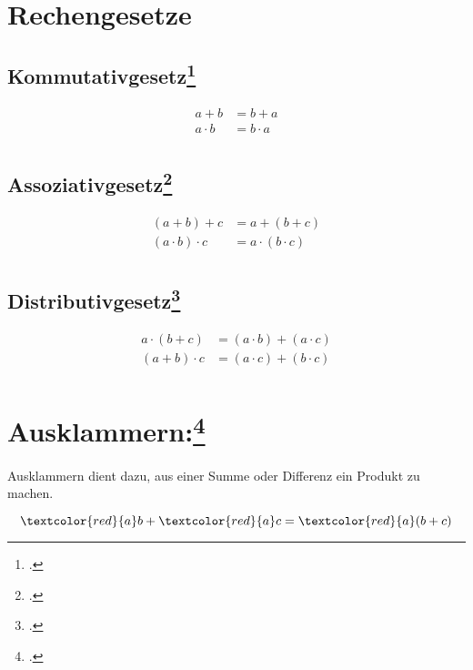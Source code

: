 \documentclass{lehramt-informatik-haupt}
\begin{document}
\section{Rechengesetze}

%

\subsection{Kommutativgesetz\footcite{wiki:kommutativgesetz}}

\begin{align*}
a + b &= b + a \\
a \cdot b &= b \cdot a \\
\end{align*}

%

\subsection{Assoziativgesetz\footcite{wiki:assoziativgesetz}}

\begin{align*}
(a + b) + c &= a + (b + c) \\
(a \cdot b) \cdot c &= a \cdot (b \cdot c) \\
\end{align*}

%

\subsection{Distributivgesetz\footcite{wiki:distributivgesetz}}

\begin{align*}
a \cdot (b + c) &= (a \cdot b) + (a \cdot c)\\
(a+b) \cdot c & = (a \cdot c) + (b \cdot c)\\
\end{align*}

\section{Ausklammern:\footcite[/ausklammern]{net:html:mathebibel}}

Ausklammern dient dazu, aus einer Summe oder Differenz ein Produkt zu
machen.

\begin{displaymath}
\textcolor{red}{a}b + \textcolor{red}{a}c = \textcolor{red}{a}(b + c)
\end{displaymath}
\end{document}
